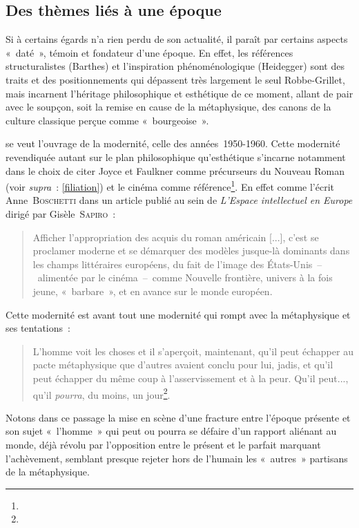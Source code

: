 \documentclass[12pt, a4paper]{article}
\begin{document}
\subsection{Des thèmes liés à une époque}

Si à certains égards \punr{} n'a rien perdu de son actualité, il paraît par certains aspects «~daté~», témoin et fondateur d'une époque. En effet, les références structuralistes (Barthes) et l'inspiration phénoménologique (Heidegger) sont des traits et des positionnements qui dépassent très largement le seul Robbe-Grillet, mais incarnent l'héritage philosophique et esthétique de ce moment, allant de pair avec le soupçon, soit la remise en cause de la métaphysique, des canons de la culture classique perçue comme «~bourgeoise~». %

\punr{} se veut l'ouvrage de la modernité, celle des années~1950-1960. Cette modernité revendiquée autant sur le plan philosophique qu'esthétique s'incarne notamment dans le choix de citer Joyce et Faulkner comme précurseurs du Nouveau Roman (voir \textit{supra}~: \ref{filiation}) et le cinéma comme référence\footnote{}. En effet comme l'écrit Anne~\textsc{Boschetti} dans un article publié au sein de \textit{L'Espace intellectuel en Europe} dirigé par Gisèle~\textsc{Sapiro}~:
\begin{quote}
    Afficher l’appropriation des acquis du roman américain [...], c’est se proclamer moderne et se démarquer des modèles jusque-là dominants dans les champs littéraires européens, du fait de l’image des États-Unis~–~alimentée par le cinéma~–~comme Nouvelle frontière, univers à la fois jeune, «~barbare~», et en avance sur le monde européen\inte.
\end{quote}
Cette modernité est avant tout une modernité qui rompt avec la métaphysique et ses tentations~:
\begin{quote}
    L’homme voit les choses et il s’aperçoit, maintenant, qu’il peut échapper au pacte métaphysique que d’autres avaient conclu pour lui, jadis, et qu’il peut échapper du même coup à l’asservissement et à la peur. Qu’il peut..., qu’il \textit{pourra}, du moins, un jour\footnote{}.
\end{quote}
Notons dans ce passage la mise en scène d'une fracture entre l'époque présente et son sujet «~l'homme~» qui peut ou pourra se défaire d'un rapport aliénant au monde, déjà révolu par l'opposition entre le présent et le parfait marquant l'achèvement, semblant presque rejeter hors de l'humain les «~autres~» partisans de la métaphysique.
\end{document}
